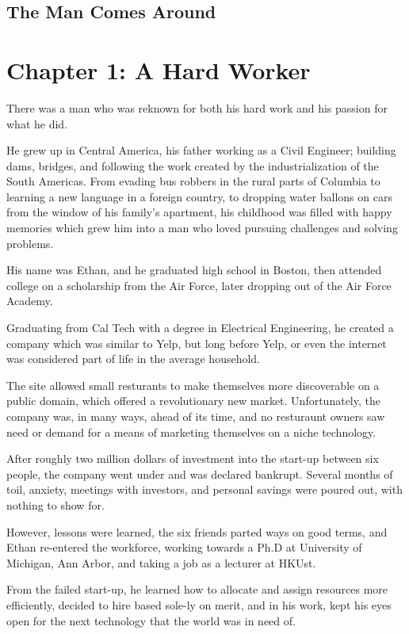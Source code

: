 \documentclass[a4paper,12pt,twoside]{book}
\begin{document}
\section{The Man Comes Around}

\chapter{Chapter 1: A Hard Worker}

There was a man who was reknown for both his hard work and his passion for what he did.  

He grew up in Central America, his father working as a Civil Engineer; building dams, bridges, and following the work created by the industrialization of the South Americas.  From evading bus robbers in the rural parts of Columbia to learning a new language in a foreign country, to dropping water ballons on cars from the window of his family's apartment, his childhood was filled with happy memories which grew him into a man who loved pursuing challenges and solving problems.

His name was Ethan, and he graduated high school in Boston, then attended college on a scholarship from the Air Force, later dropping out of the Air Force Academy.

Graduating from Cal Tech with a degree in Electrical Engineering, he created a company which was similar to Yelp, but long before Yelp, or even the internet was considered part of life in the average household.  

The site allowed small resturants to make themselves more discoverable on a public domain, which offered a revolutionary new market.  Unfortunately, the company was, in many ways, ahead of its time, and no resturaunt owners saw need or demand for a means of marketing themselves on a niche technology. 

After roughly two million dollars of investment into the start-up between six people, the company went under and was declared bankrupt.  Several months of toil, anxiety, meetings with investors, and personal savings were poured out, with nothing to show for.

However, lessons were learned, the six friends parted ways on good terms, and Ethan re-entered the workforce, working towards a Ph.D at University of Michigan, Ann Arbor, and taking a job as a lecturer at HKUst.

From the failed start-up, he learned how to allocate and assign resources more efficiently, decided to hire based sole-ly on merit, and in his work, kept his eyes open for the next technology that the world was in need of.
\end{document}
